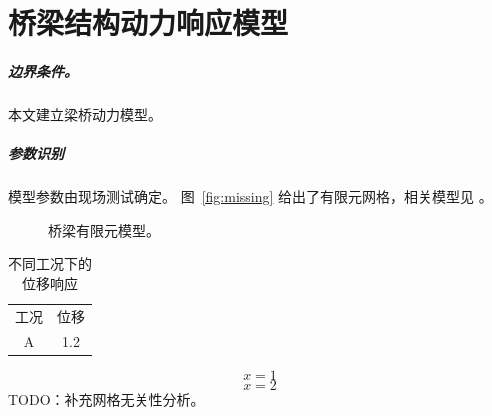 \documentclass{book}
\begin{document}
\chapter{桥梁结构动力响应模型}
\paragraph{边界条件。}本文建立梁桥动力模型。
\paragraph{参数识别}模型参数由现场测试确定。
图~\ref{fig:missing} 给出了有限元网格，相关模型见 \citep{missing2025}。
\begin{figure}[htbp]
  \caption{桥梁有限元模型。}
\end{figure}
\begin{table}[htbp]
  \caption{不同工况下的位移响应}
  \label{tab:response}
  \begin{tabular}{cc}工况 & 位移\\A & 1.2\end{tabular}
\end{table}
\begin{equation}\label{eq:duplicate}x=1\end{equation}
\begin{equation}\label{eq:duplicate}x=2\end{equation}
TODO：补充网格无关性分析。

\end{document}
